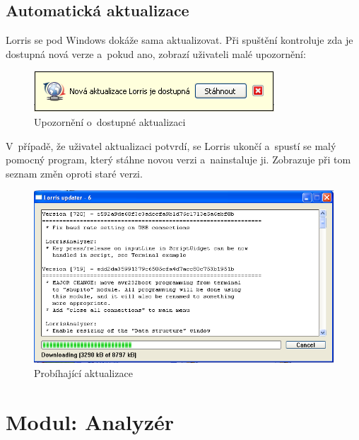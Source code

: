 \documentclass[12pt, a4paper, oneside]{article}
\begin{document}
\subsection{Automatická aktualizace}
Lorris se pod Windows dokáže sama aktualizovat. Při spuštění kontroluje zda je dostupná nová verze a~pokud ano, zobrazí uživateli malé upozornění:
\begin{figure}[H]
\begin{center}
\includegraphics[scale=1]{img/update_notify.png}
\caption{Upozornění o~dostupné aktualizaci}
\end{center}
\end{figure}
V~případě, že uživatel aktualizaci potvrdí, se Lorris ukončí a~spustí se malý pomocný program, který stáhne novou verzi a~nainstaluje ji. Zobrazuje při tom seznam změn oproti staré verzi.
\begin{figure}[H]
\begin{center}
\includegraphics[scale=0.65]{img/updater.png}
\caption{Probíhající aktualizace}
\end{center}
\end{figure}

\setlength{\voffset}{0mm}
\addtolength{\textheight}{-20mm}
\newpage
\section{Modul: Analyzér}
\end{document}
